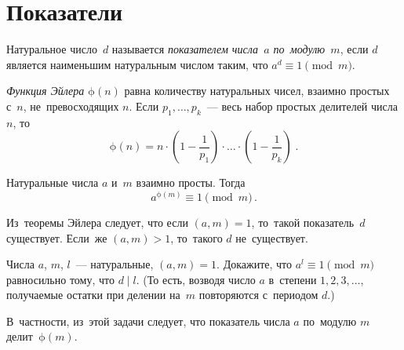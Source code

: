 
\section*{Показатели}


\begingroup
    \ifx\mathup\undefined
        \def\eulerphi{\upphi}
    \else
        \def\eulerphi{\mathrm{\phi}}
    \fi
    \def\divides{\mathrel{\vert}}

Натуральное число~$d$ называется \emph{показателем числа~$a$ по~модулю~$m$},
если $d$ является наименьшим натуральным числом таким, что
$a^d \equiv 1 \pmod{m}$.

\emph{Функция Эйлера} $\eulerphi(n)$ равна количеству натуральных чисел,
взаимно простых с~$n$, не~превосходящих $n$.
Если $p_1, \ldots, p_k$~--- весь набор простых делителей числа $n$,
то
\[
    \eulerphi(n)
=
    n
    \cdot
    \left( 1 - \frac{1}{p_1} \right)
    \cdot \ldots \cdot
    \left( 1 - \frac{1}{p_k} \right)
\; . \]

Натуральные числа $a$ и~$m$ взаимно просты.
Тогда
\[
    a^{\eulerphi(m)} \equiv 1 \pmod{m}
\, . \]

Из~теоремы Эйлера следует, что если $(a, m) = 1$, то~такой показатель~$d$
существует.
Если~же $(a, m) > 1$, то~такого $d$ не~существует.

\begin{problems}

\item
Числа $a$, $m$, $l$~--- натуральные, $(a, m) = 1$.
Докажите, что $a^l \equiv 1 \pmod{m}$ равносильно тому, что $d \divides l$.
(То есть, возводя число $a$ в~степени $1, 2, 3, \ldots$, получаемые остатки при
делении на~$m$ повторяются с~периодом $d$.)

\end{problems}

В~частности, из~этой задачи следует, что показатель числа $a$ по~модулю $m$
делит~$\eulerphi(m)$.

